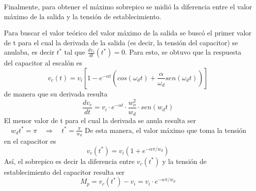 Finalmente, para obtener el máximo sobrepico se midió la diferencia entre el valor máximo de la salida y la tensión de establecimiento.
\par Para buscar el valor teórico del valor máximo de la salida se buscó el primer valor de t para el cual la derivada de la salida (es decir, la tensión del capacitor) se anulaba, es decir $ t^\ast $ tal que $\frac{dv_c}{dt}(t^\ast) = 0$. Para esto, se obtuvo que la respuesta del capacitor al escalón es
\begin{equation*}
    v_c(t)= v_i \left[    1 - e^{-\alpha t} \left( cos(\omega_d t)+\frac{\alpha}{\omega_d} sen(\omega_d t)  \right)  \right]
\end{equation*}
de manera que su derivada resulta
\begin{equation*}
    \frac{dv_c}{dt} = v_i \cdot e^{-\alpha t} \cdot \frac{w_o^2}{w_d} \cdot sen(w_d t)
\end{equation*}
El menor valor de t para el cual la derivada se anula resulta ser $ \quad w_d t^\ast = \pi \quad \Rightarrow \quad t^\ast = \frac{\pi}{w_d} $
De esta manera, el valor máximo que toma la tensión en el capacitor es 
\begin{equation*}
    v_c(t^\ast)=v_i \left(  1 + e^{-\alpha \pi / w_d} \right)
\end{equation*}
Así, el sobrepico es decir la diferencia entre $ v_c(t^\ast) $ y la tensión de establecimiento del capacitor resulta ser
\begin{equation*}
    M_p = v_c(t^\ast) - v_i = v_i \cdot e^{-\alpha \pi / w_d}
\end{equation*}

